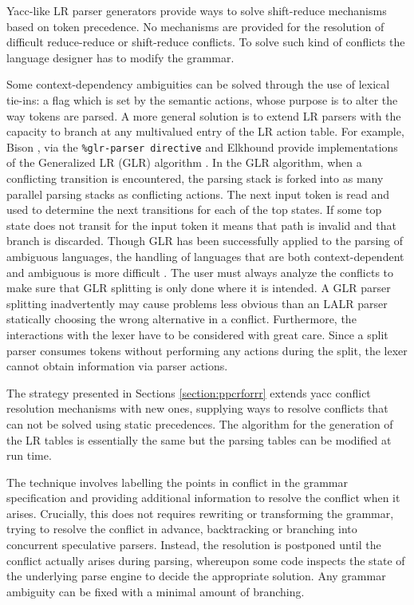 Yacc-like LR parser generators \cite{Johnsonyacc} provide ways to solve shift-reduce mechanisms
based on token precedence. No mechanisms are provided for the resolution
of difficult reduce-reduce or shift-reduce conflicts. 
To solve such kind of conflicts the language designer 
has to modify
the grammar. 

Some  context-dependency ambiguities can be solved through the use of lexical tie-ins: a flag
which is set by the semantic actions, whose purpose is to alter the way
tokens are parsed. 
A more general solution is to extend 
LR parsers with the capacity to branch
at any multivalued entry of the LR action table. For example, Bison \cite{bison},
via the \verb|%glr-parser directive| 
and Elkhound \cite{elkhound}
provide implementations of the Generalized LR (GLR) algorithm \cite{tomita2}.
In the GLR algorithm, when a conflicting transition is encountered, 
the parsing stack is forked
into as many parallel parsing stacks as conflicting actions.
The next input token
is read and used to determine the next transitions for each of the
top states. If some top state does not transit for 
the input token it means that path is invalid and that branch
is discarded. 
Though GLR has been successfully applied to
the parsing of ambiguous languages, the handling 
of languages that are both context-dependent and ambiguous 
is more difficult \cite{kelbt}. 
The user must always analyze
the conflicts to make sure that GLR splitting is only
done where it is intended. A GLR parser splitting inadvertently may cause
problems less obvious than an LALR parser statically choosing the wrong
alternative in a conflict. Furthermore, the interactions with the lexer
have to be considered with great care. Since a split parser consumes
tokens without performing any actions during the split, the lexer cannot
obtain information via parser actions. 

The strategy presented in Sections
\ref{section:ppcrforrr}
extends yacc conflict resolution mechanisms
with new ones, supplying ways to resolve conflicts
that can not be solved using static precedences. 
The algorithm for the generation of the LR tables is essentially the same
but the parsing tables can be modified
at run time. 

The technique involves labelling the points in conflict in the grammar specification
and providing additional information to resolve the conflict when it arises.
Crucially, this does not requires rewriting or transforming the grammar,
trying to resolve the conflict in advance, backtracking or branching into concurrent
speculative parsers. Instead, the resolution is postponed until the conflict actually arises
during parsing, whereupon some code inspects the state of the underlying parse
engine to decide the appropriate solution. 
Any grammar ambiguity can be fixed with a minimal amount of branching.


